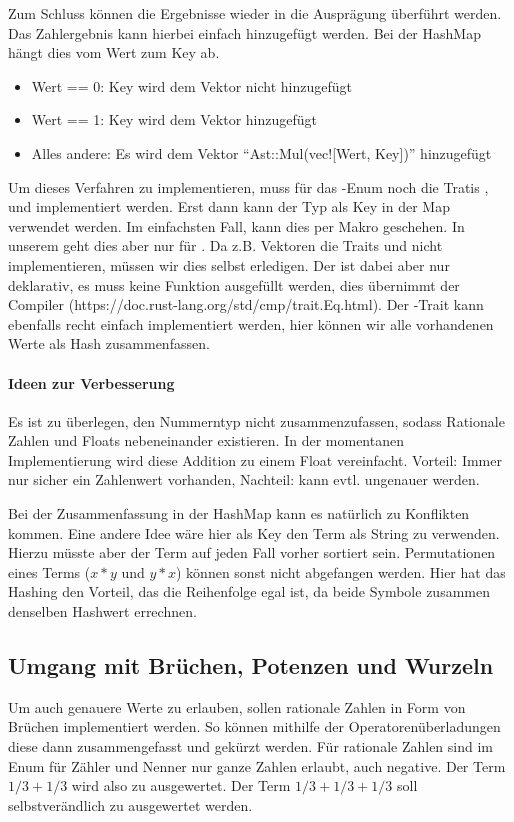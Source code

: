 \documentclass[11pt,a4paper, ngerman]{article}
\begin{document}
Zum Schluss können die Ergebnisse wieder in die Ausprägung  überführt werden. Das Zahlergebnis kann hierbei einfach hinzugefügt werden. Bei der HashMap hängt dies vom Wert zum Key ab. 

\begin{itemize}
    \item Wert == 0: Key wird dem Vektor nicht hinzugefügt
    \item Wert == 1: Key wird dem Vektor hinzugefügt
    \item Alles andere: Es wird dem Vektor ``Ast::Mul(vec![Wert, Key])'' hinzugefügt
\end{itemize}

Um dieses Verfahren zu implementieren, muss für das -Enum noch die Tratis ,  und  implementiert werden. Erst dann kann der Typ  als Key in der Map verwendet werden. Im einfachsten Fall, kann dies per Makro geschehen. In unserem geht dies aber nur für . Da z.B. Vektoren die Traits  und  nicht implementieren, müssen wir dies selbst erledigen. Der  ist dabei aber nur deklarativ, es muss keine Funktion ausgefüllt werden, dies übernimmt der Compiler (https://doc.rust-lang.org/std/cmp/trait.Eq.html). Der -Trait kann ebenfalls recht einfach implementiert werden, hier können wir alle vorhandenen Werte als Hash zusammenfassen.

\paragraph{Ideen zur Verbesserung} Es ist zu überlegen, den Nummerntyp nicht zusammenzufassen, sodass Rationale Zahlen und Floats nebeneinander existieren. In der momentanen Implementierung wird diese Addition zu einem Float vereinfacht. Vorteil: Immer nur sicher ein Zahlenwert vorhanden, Nachteil: kann evtl. ungenauer werden.

Bei der Zusammenfassung in der HashMap kann es natürlich zu Konflikten kommen. Eine andere Idee wäre hier als Key den Term als String zu verwenden. Hierzu müsste aber der Term auf jeden Fall vorher sortiert sein. Permutationen eines Terms ($x*y$ und $y*x$) können sonst nicht abgefangen werden. Hier hat das Hashing den Vorteil, das die Reihenfolge egal ist, da beide Symbole zusammen denselben Hashwert errechnen.

\subsection{Umgang mit Brüchen, Potenzen und Wurzeln}
Um auch genauere Werte zu erlauben, sollen rationale Zahlen in Form von Brüchen implementiert werden. So können mithilfe der Operatorenüberladungen diese dann zusammengefasst und gekürzt werden. Für rationale Zahlen sind im Enum  für Zähler und Nenner nur ganze Zahlen erlaubt, auch negative. Der Term $1/3+1/3$ wird also zu  ausgewertet. Der Term $1/3+1/3+1/3$ soll selbstverändlich zu  ausgewertet werden.
\end{document}
